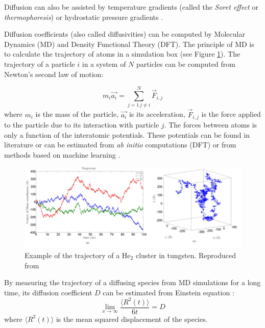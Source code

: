 Diffusion can also be assisted by temperature gradients (called the \textit{Soret effect} or \textit{thermophoresis})  or hydrostatic pressure gradients .

Diffusion coefficients (also called diffusivities) can be computed by Molecular Dynamics (MD) and Density Functional Theory (DFT).
The principle of MD is to calculate the trajectory of atoms in a simulation box (see Figure \ref{fig: md faney}).
The trajectory of a particle $i$ in a system of $N$ particles can be computed from Newton's second law of motion:

\begin{equation}
    m_i \vec{a_i} = \sum_{j=1 \, j \neq i}^N \vec{F}_{i,j}
\end{equation}
where $m_i$ is the mass of the particle, $\vec{a_i}$ is its acceleration, $\vec{F}_{i,j}$ is the force applied to the particle due to its interaction with particle $j$.
The forces between atoms is only a function of the interatomic potentials.
These potentials can be found in literature or can be estimated from \textit{ab initio} computations (DFT)  or from methods based on machine learning .

\begin{figure}
    \centering
    \includegraphics[width=\linewidth]{Figures/Chapter1/faney_md.jpg}
    \caption{Example of the trajectory of a He$_2$ cluster in tungsten. Reproduced from \cite{faney_numerical_2013}}
    \label{fig: md faney}
\end{figure}

By measuring the trajectory of a diffusing species from MD simulations for a long time, its diffusion coefficient $D$ can be estimated from Einstein equation \cite{einstein_uber_1905}:
\begin{equation}
    \lim_{x\to\infty} \frac{\langle R^2(t) \rangle}{6t} = D
\end{equation}
where $\langle R^2(t) \rangle$ is the mean squared displacement of the species.

